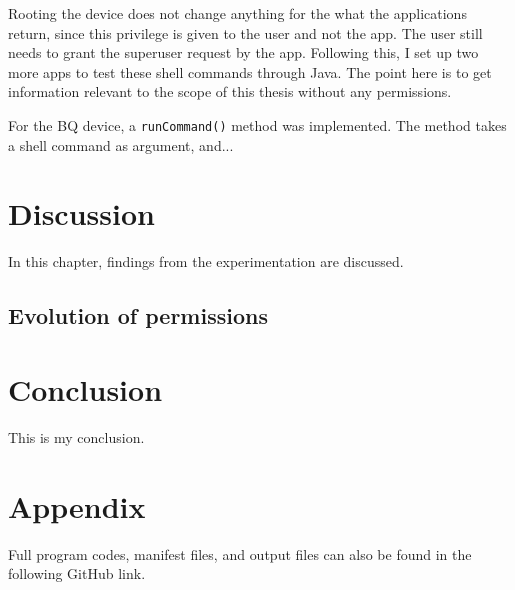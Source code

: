 \documentclass[
  a4paper,  %
  twoside,  %
  bibliography=totoc,
  headsepline,
  cleardoublepage=empty,
  parskip=half,
  draft=false,
  open=any
]{scrbook}
\begin{document}
Rooting the device does not change anything for the what the applications return, since this privilege is given to the user and not the app. The user still needs to grant the superuser request by the app. Following this, I set up two more apps to test these shell commands through Java. The point here is to get information relevant to the scope of this thesis without any permissions. 

For the BQ device, a \texttt{runCommand()} method was implemented. The method takes a shell command as argument, and...

\chapter{Discussion}
\label{cha:discussion}
In this chapter, findings from the experimentation are discussed.

\section{Evolution of permissions}


\chapter{Conclusion}
\label{cha:conclusion}


This is my conclusion. 

\printbibliography

\appendix
\chapter{Appendix}
Full program codes, manifest files, and output files can also be found in the following GitHub link.

%

%

%

%
\end{document}

